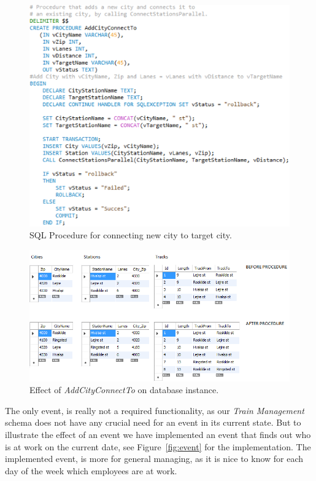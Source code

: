 \begin{figure}[h]
    \centering
    \includegraphics[scale=.75]{img/SQL_PROCEDURE_AddCityConnect}
    \caption{SQL Procedure for connecting new city to target city.}
    \label{fig:connectcity}
\end{figure}

\begin{figure}[h]
    \centering
    \includegraphics[scale=.75]{img/SQL_PROCEDURE_AddCityConnect_example}
    \caption{Effect of \emph{AddCityConnectTo} on database instance.}
\end{figure}
\label{fig:effect}

The only event, is really not a required functionality, as our \emph{Train 
Management} schema does not have any crucial need for an event in its current 
state. But to illustrate the effect of an event we have implemented an event 
that finds out who is at work on the current date, see Figure~\ref{fig:event} 
for the implementation. The implemented event, is more for general managing, as 
it is nice to know for each day of the week which employees are at work.


